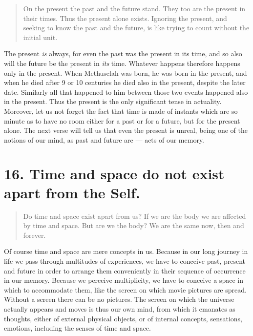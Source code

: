 \documentclass[12pt]{report}
\begin{document}
\begin{quote}
  On the present the past and the future stand. They too are the present
  in their times. Thus the present alone exists. Ignoring the present,
  and seeking to know the past and the future, is like trying to count
  without the initial unit.
\end{quote}

The present \emph{is} always, for even the past was the present in its
time, and so also will the future be the present in \emph{its}
time. Whatever happens therefore happens only in the present. When
Methuselah was born, he was born in the present, and when he died
after 9 or 10 centuries he died also in the present, despite the later
date. Similarly all that happened to him between those two events
happened also in the present. Thus the present is the only significant
tense in actuality. Moreover, let us not forget the fact that time is
made of instants which are so minute as to have no room either for a
past or for a future, but for the present alone. The next verse will
tell us that even the present is unreal, being one of the notions of
our mind, as past and future are --- acts of our memory.


\section{16. Time and space do not exist apart from the Self.}

\begin{quote}
  Do time and space exist apart from us? If we are the body we are
  affected by time and space. But are we the body? We are the same now,
  then and forever.
\end{quote}


Of course time and space are mere concepts in us. Because in our long
journey in life we pass through multitudes of experiences, we have to
conceive past, present and future in order to arrange them
conveniently in their sequence of occurrence in our memory. Because we
perceive multiplicity, we have to conceive a space in which to
accommodate them, like the screen on which movie pictures are
spread. Without a screen there can be no pictures. The screen on which
the universe actually appears and moves is thus our own mind, from
which it emanates as thoughts, either of external physical objects, or
of internal concepts, sensations, emotions, including the senses of
time and space. 
\end{document}
